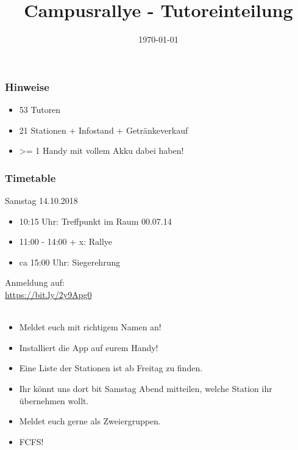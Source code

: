 \documentclass{beamer}
\title{Campusrallye - Tutoreinteilung}
\subtitle{}
\author{}
\date{\today}
\begin{document}
	
	\maketitle
	
	\begin{frame}
		\huge
		\center
		\frametitle{Hinweise}
		
		\begin{itemize}
			\item 53 Tutoren
			\item 21 Stationen + Infostand + Getränkeverkauf 
			\item >= 1 Handy mit vollem Akku dabei haben!
		\end{itemize}
	\end{frame}
	
	
	
	\begin{frame}
		\huge
		
		\frametitle{Timetable}
		Samstag 14.10.2018\\
		
		\begin{itemize}
			\item 10:15 Uhr: Treffpunkt \normalsize im Raum 00.07.14 \huge
			\item 11:00 - 14:00 + x: Rallye 
			\item ca 15:00 Uhr: Siegerehrung
		\end{itemize}
	\end{frame}
	
	
	
	
	\begin{frame}
		\huge
		\begin{center}
			Anmeldung auf: \\
			\url{https://bit.ly/2y9Apg0} \\ \ \\
		
		\end{center}
		\large
		\begin{itemize}
			\item Meldet euch mit richtigem Namen an!
			\item Installiert die App auf eurem Handy!
			\item Eine Liste der Stationen ist ab Freitag zu finden.
			\item Ihr könnt uns dort bit Samstag Abend mitteilen, welche Station ihr übernehmen wollt.
			\item Meldet euch gerne als Zweiergruppen.
			\item FCFS!
		\end{itemize}
		
	\end{frame}
	
\end{document}

